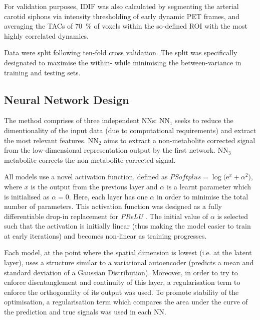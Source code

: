         For validation purposes, \gls{IDIF} was also calculated by segmenting the arterial carotid siphons via intensity thresholding of early  dynamic \gls{PET} frames, and averaging the \glspl{TAC} of \SI{70}{\percent} of voxels within the so-defined \gls{ROI} with the most highly correlated dynamics.

        Data were split following ten-fold cross validation. The split was specifically designated to maximise the within- while minimising the between-variance in training and testing sets.

    \vspace{-0.5cm}
    
    \subsection{Neural Network Design}\label{sec:NNDesign}
        The method comprises of three independent \glspl{NN}: \gls{NN}$_1$ seeks to reduce the dimentionality of the input data (due to computational requirements) and extract the most relevant features. \gls{NN}$_2$ aims to extract a non-metabolite corrected signal from the low-dimensional representation output by the first network. \gls{NN}$_3$ metabolite corrects the non-metabolite corrected signal.

        All models use a novel activation function, defined as $PSoftplus = \log\big(\mathrm{e}^{x} + \alpha^2 \big)$, where $x$ is the output from the previous layer and $\alpha$ is a learnt parameter which is initialised as $\alpha = 0$. Here, each layer has one $\alpha$ in order to minimise the total number of parameters. This activation function was designed as a fully differentiable drop-in replacement for \textit{PReLU} \cite{Ciuparu2020Soft++Architectures}. The initial value of $\alpha$ is selected such that the activation is initially linear (thus making the model easier to train at early iterations) and becomes non-linear as training progresses.

        Each model, at the point where the spatial dimension is lowest (i.e. at the latent layer), uses a structure similar to a variational autoencoder (predicts a mean and standard deviation of a Gaussian Distribution). Moreover, in order to try to enforce disentanglement and continuity of this layer, a regularisation term to enforce the orthogonality of its output was used. To promote stability of the optimisation, a regularisation term which compares the area under the curve of the prediction and true signals was used in each \gls{NN}.

